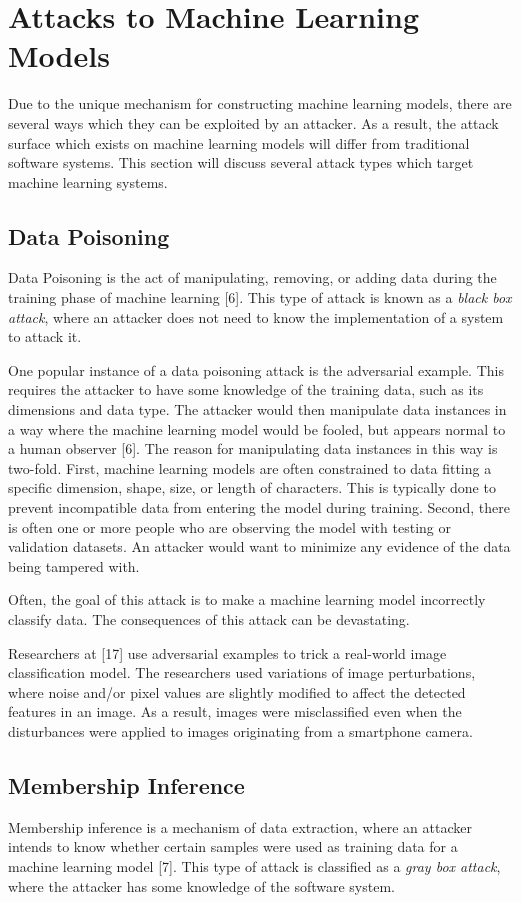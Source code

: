 \documentclass[11pt,conference]{IEEEtran}
\begin{document}
\section{Attacks to Machine Learning Models}
Due to the unique mechanism for constructing machine learning models, there are
several ways which they can be exploited by an attacker. As a result, the
attack surface which exists on machine learning models will differ from
traditional software systems.
This section will discuss several attack types which target machine learning
systems.

\subsection{Data Poisoning}
Data Poisoning is the act of manipulating, removing, or adding
data during the training phase of machine learning [6]. This type of attack is
known as a \emph{black box attack}, where an attacker does not need to know the
implementation of a system to attack it.

One popular instance of a data poisoning attack is the adversarial
example. This requires the attacker to have some knowledge of the
training data, such as its dimensions and data type. The attacker would then
manipulate data instances in a way where the machine learning model would
be fooled, but appears normal to a human observer [6]. The reason for manipulating
data instances in this way is two-fold. First, machine learning models are
often constrained to data fitting a specific dimension, shape, size, or length
of characters. This is typically done to prevent incompatible data from
entering the model during training. Second, there is often one or more people
who are observing the model with testing or validation datasets. An attacker
would want to minimize any evidence of the data being tampered with.

Often, the goal of this
attack is to make a machine learning model incorrectly classify data. The
consequences of this attack can be devastating. 

Researchers at [17] use adversarial examples to trick a real-world image
classification model. The researchers used variations of image perturbations, where noise
and/or pixel values are slightly modified to affect the detected features in an
image. As a result, images were misclassified even when the disturbances were
applied to images originating from a smartphone camera.

\subsection{Membership Inference}
Membership inference is a mechanism of data extraction, where an attacker 
intends to know whether certain samples were used as training data for a
machine learning model [7]. This type of attack is classified as a \emph{gray
box attack}, where the attacker has some knowledge of the software system.
\end{document}
